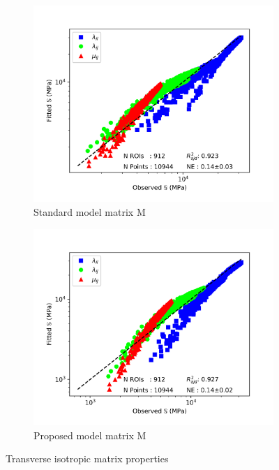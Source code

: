 \documentclass[a4paper,fleqn]{DC_ArtStyle}
\begin{document}
\begin{figure}[!h]
\begin{subfigure}[b]{0.45\linewidth}
			\includegraphics[width=\linewidth]{RegressionFabric_Transverse_Mmat}
			\caption{Standard model matrix M}
		\end{subfigure}
		\begin{subfigure}[b]{0.45\linewidth}
			\includegraphics[width=\linewidth]{RegressionFabricK_Transverse_Mmat}
			\caption{Proposed model matrix M}
		\end{subfigure}
		\caption{Transverse isotropic matrix properties}
	\end{figure}

	\clearpage
\end{document}

